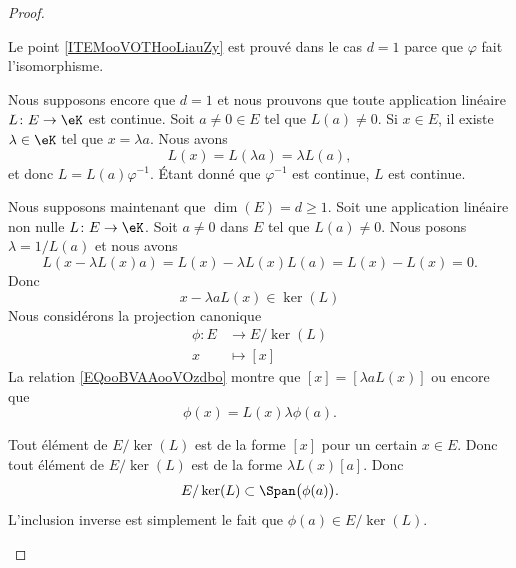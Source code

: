 \begin{proof}
\begin{subproof}
		\spitem[\ref{ITEMooVOTHooLiauZy} si \( d=1\)]
		Le point \ref{ITEMooVOTHooLiauZy} est prouvé dans le cas \( d=1\) parce que \( \varphi\) fait l'isomorphisme.

		\spitem[\(L \colon E\to \eK  \) est continue si \( d=1\)]
		Nous supposons encore que \( d=1\) et nous prouvons que toute application linéaire \(L \colon E\to \eK  \) est continue. Soit \( a\neq 0\in E\) tel que \( L(a)\neq 0\). Si \( x\in E\), il existe \( \lambda\in \eK\) tel que \( x=\lambda a\). Nous avons
		\begin{equation}
			L(x)=L(\lambda a)=\lambda L(a),
		\end{equation}
		et donc \( L=L(a)\varphi^{-1}\). Étant donné que \( \varphi^{-1}\) est continue, \( L\) est continue.

		\spitem[Noyau de \( L\)]
		Nous supposons maintenant que \( \dim(E)=d\geq 1\). Soit une application linéaire non nulle \(L \colon E\to \eK  \). Soit \( a\neq 0\) dans \( E\) tel que \( L(a)\neq 0\). Nous posons \( \lambda=1/L(a)\) et nous avons
		\begin{equation}
			L(x-\lambda L(x)a)=L(x)-\lambda L(x)L(a)=L(x)-L(x)=0.
		\end{equation}
		Donc
		\begin{equation}	\label{EQooBVAAooVOzdbo}
			x-\lambda a L(x)\in \ker (L)
		\end{equation}
		Nous considérons la projection canonique
		\begin{equation}
			\begin{aligned}
				\phi\colon E & \to E/\ker(L) \\
				x            & \mapsto [x]
			\end{aligned}
		\end{equation}
		La relation \eqref{EQooBVAAooVOzdbo} montre que \( [x]=[\lambda a L(x)]\) ou encore que
		\begin{equation}
			\phi(x)=L(x)\lambda \phi(a).
		\end{equation}

		\spitem[\( E/\ker(L)=\Span\big( \phi(a) \big)\)]
		Tout élément de \( E/\ker(L)\) est de la forme \( [x]\) pour un certain \( x\in E\). Donc tout élément de \( E/\ker(L)\) est de la forme \( \lambda L(x)[a]\). Donc
		\begin{equation}
			E/\ker(L)\subset \Span\big( \phi(a) \big).
		\end{equation}
		L'inclusion inverse est simplement le fait que \( \phi(a)\in E/\ker(L)\).


\end{subproof}
\end{proof}
